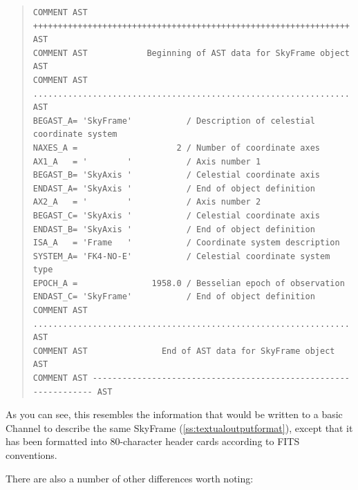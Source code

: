 \documentclass[twoside,11pt]{article}
\newcommand{\htmlref}[2]{#1}
\newcommand{\secref}[1]{\S\ref{#1}}
\renewcommand{\secref}[1]{\ref{#1}}
\begin{document}
\begin{quote}
\small
\begin{verbatim}
COMMENT AST ++++++++++++++++++++++++++++++++++++++++++++++++++++++++++++++++ AST
COMMENT AST            Beginning of AST data for SkyFrame object             AST
COMMENT AST ................................................................ AST
BEGAST_A= 'SkyFrame'           / Description of celestial coordinate system     
NAXES_A =                    2 / Number of coordinate axes                      
AX1_A   = '        '           / Axis number 1                                  
BEGAST_B= 'SkyAxis '           / Celestial coordinate axis                      
ENDAST_A= 'SkyAxis '           / End of object definition                       
AX2_A   = '        '           / Axis number 2                                  
BEGAST_C= 'SkyAxis '           / Celestial coordinate axis                      
ENDAST_B= 'SkyAxis '           / End of object definition                       
ISA_A   = 'Frame   '           / Coordinate system description                  
SYSTEM_A= 'FK4-NO-E'           / Celestial coordinate system type               
EPOCH_A =               1958.0 / Besselian epoch of observation                 
ENDAST_C= 'SkyFrame'           / End of object definition                       
COMMENT AST ................................................................ AST
COMMENT AST               End of AST data for SkyFrame object                AST
COMMENT AST ---------------------------------------------------------------- AST
\end{verbatim}
\normalsize
\end{quote}

As you can see, this resembles the information that would be written
to a basic \htmlref{Channel}{Channel} to describe the same SkyFrame
(\secref{ss:textualoutputformat}), except that it has been formatted
into 80-character header cards according to FITS conventions.

There are also a number of other differences worth noting:
\end{document}
